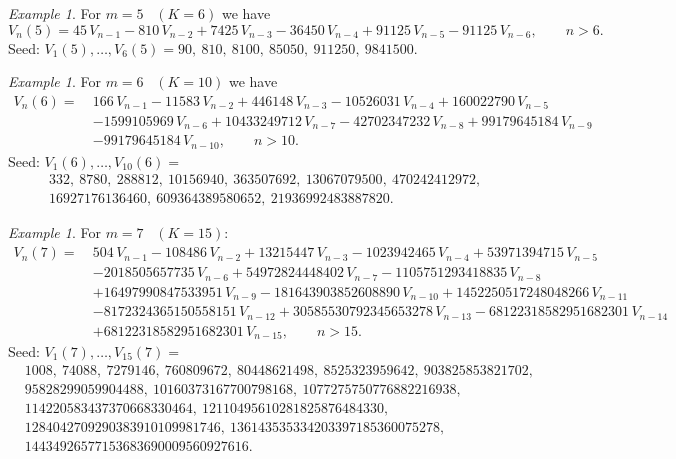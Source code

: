 \documentclass[11pt,reqno]{amsart}
\theoremstyle{remark}
\newtheorem{example}[theorem]{Example}
\begin{document}

\begin{example}
  For $m=5$ \ $(K=6)$ we have
$$
V_n(5) = 45\,V_{n-1} - 810\,V_{n-2} + 7425\,V_{n-3} - 36450\,V_{n-4} + 91125\,V_{n-5} - 91125\,V_{n-6}, \qquad n>6.
$$
Seed: $V_1(5),\dots,V_6(5) = 90,\ 810,\ 8100,\ 85050,\ 911250,\ 9841500$.
\end{example}

\begin{example}
  For $m=6$ \ $(K=10)$ we have
\begin{align*}
V_n(6) = \ &166\,V_{n-1} - 11583\,V_{n-2} + 446148\,V_{n-3} - 10526031\,V_{n-4} + 160022790\,V_{n-5}\\
&- 1599105969\,V_{n-6} + 10433249712\,V_{n-7} - 42702347232\,V_{n-8} + 99179645184\,V_{n-9}\\
&- 99179645184\,V_{n-10}, \qquad n>10.
\end{align*}
Seed: $V_1(6),\dots,V_{10}(6) =$
\begin{align*}
&332,\ 8780,\ 288812,\ 10156940,\ 363507692,\ 13067079500,\ 470242412972,\\
&16927176136460,\ 609364389580652,\ 21936992483887820.
\end{align*}
\end{example}

\begin{example}
  For $m=7$ \ $(K=15)$:
\begin{align*}
V_n(7) = \ &504\,V_{n-1} - 108486\,V_{n-2} + 13215447\,V_{n-3} - 1023942465\,V_{n-4} + 53971394715\,V_{n-5}\\
&- 2018505657735\,V_{n-6} + 54972824448402\,V_{n-7} - 1105751293418835\,V_{n-8}\\
&+ 16497990847533951\,V_{n-9} - 181643903852608890\,V_{n-10} + 1452250517248048266\,V_{n-11}\\
&- 8172324365150558151\,V_{n-12} + 30585530792345653278\,V_{n-13} - 68122318582951682301\,V_{n-14}\\
&+ 68122318582951682301\,V_{n-15}, \qquad n>15.
\end{align*}
Seed: $V_1(7),\dots,V_{15}(7) =$
\begin{align*}
&1008,\ 74088,\ 7279146,\ 760809672,\ 80448621498,\ 8525323959642,\ 903825853821702,\\
&95828299059904488,\ 10160373167700798168,\ 1077275750776882216938,\\
&114220583437370668330464,\  12110495610281825876484330,\\
&1284042709290383910109981746,\ 136143535334203397185360075278,\\
&14434926577153683690009560927616.
\end{align*}
\end{example}
\end{document}
